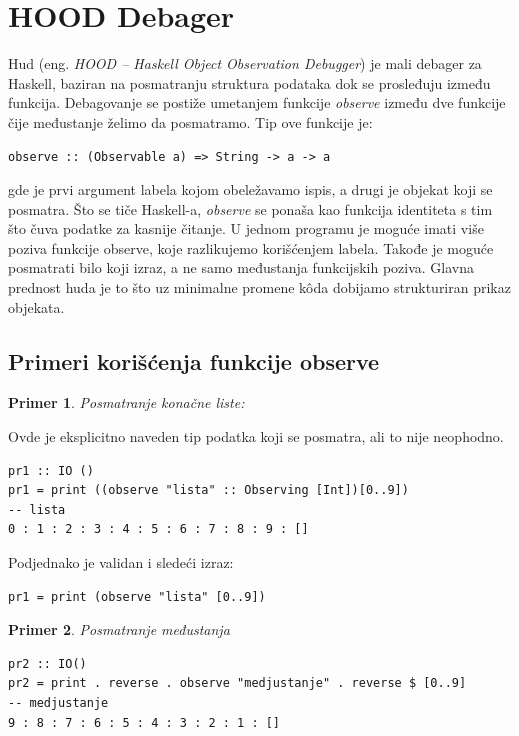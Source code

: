 \documentclass[a4paper]{article}
\newtheorem{primer}{Primer}[section]
\begin{document}
\section{HOOD Debager}
Hud (eng. {\em HOOD -- Haskell Object Observation Debugger}) je mali debager za Haskell, baziran na posmatranju struktura podataka dok se prosleđuju između funkcija.
Debagovanje se postiže umetanjem funkcije {\em observe} između dve funkcije čije međustanje želimo da posmatramo.
Tip ove funkcije je:\newline

\begin{lstlisting}
observe :: (Observable a) => String -> a -> a
\end{lstlisting} 

gde je prvi argument labela kojom obeležavamo ispis, a drugi je objekat koji se posmatra. 
Što se tiče Haskell-a, {\em observe} se ponaša kao funkcija identiteta s tim što čuva podatke za kasnije čitanje.
U jednom programu je moguće imati više poziva funkcije observe, koje razlikujemo korišćenjem labela.
Takođe je moguće posmatrati bilo koji izraz, a ne samo međustanja funkcijskih poziva.
Glavna prednost huda je to što uz minimalne promene k\^{o}da dobijamo strukturiran prikaz objekata.

\subsection{Primeri korišćenja funkcije observe}
\begin{primer}
 Posmatranje konačne liste:
\end{primer}
Ovde je eksplicitno naveden tip podatka koji se posmatra, ali to nije neophodno.
\begin{lstlisting}
pr1 :: IO ()
pr1 = print ((observe "lista" :: Observing [Int])[0..9])
-- lista
0 : 1 : 2 : 3 : 4 : 5 : 6 : 7 : 8 : 9 : []
\end{lstlisting}

Podjednako je validan i sledeći izraz: 
\begin{lstlisting}
pr1 = print (observe "lista" [0..9])
\end{lstlisting}

\begin{primer} 
Posmatranje međustanja
\end{primer}

\begin{lstlisting}
pr2 :: IO()
pr2 = print . reverse . observe "medjustanje" . reverse $ [0..9]
-- medjustanje
9 : 8 : 7 : 6 : 5 : 4 : 3 : 2 : 1 : []
\end{lstlisting}
\end{document}
